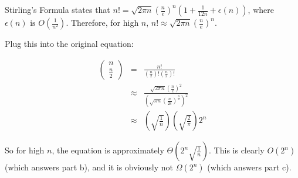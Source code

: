 \documentclass[12pt]{article}
\begin{document}
Stirling's Formula states that $n! = \sqrt{2 \pi n}\left(\frac{n}{e}\right)^n\left(1 + \frac{1}{12n} + \epsilon\left(n\right)\right)$, where $\epsilon\left(n\right) \mbox{ is } O\left(\frac{1}{n^2}\right)$.
Therefore, for high $n$, $n! \approx \sqrt{2 \pi n}\left(\frac{n}{e}\right)^n$.

Plug this into the original equation:

\begin{eqnarray*}
\left(\begin{array}{c}n\\\frac{n}{2}\end{array}\right)
 &=& \frac{n!}{\left(\frac{n}{2}\right)!\left(\frac{n}{2}\right)!} \\
 &\approx& \frac{\sqrt{2\pi n}\left(\frac{n}{e}\right)^2}{\left(\sqrt{\pi n}\left(\frac{n}{2e}\right)^\frac{n}{2}\right)^2} \\
 &\approx& \left(\sqrt{\frac{1}{n}}\right)\left(\sqrt{\frac{2}{\pi}}\right)2^n
\end{eqnarray*}

So for high $n$, the equation is approximately $\Theta\left(2^n\sqrt{\frac{1}{n}}\right)$. This is clearly $O\left(2^n\right)$ (which answers part b), and it is obviously not $\Omega\left(2^n\right)$ (which answers part c).
\end{document}
